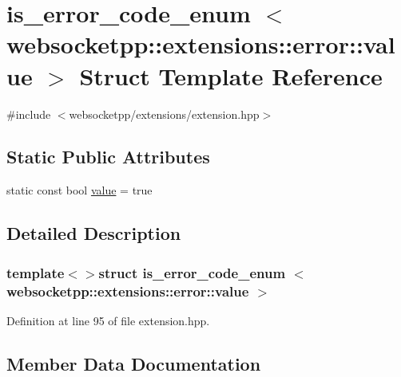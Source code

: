 \hypertarget{structis__error__code__enum_01_01_01_01_3_01websocketpp_1_1extensions_1_1error_1_1value_01_4}{}\section{is\+\_\+error\+\_\+code\+\_\+enum $<$ websocketpp\+:\+:extensions\+:\+:error\+:\+:value $>$ Struct Template Reference}
\label{structis__error__code__enum_01_01_01_01_3_01websocketpp_1_1extensions_1_1error_1_1value_01_4}


{\ttfamily \#include $<$websocketpp/extensions/extension.\+hpp$>$}

\subsection*{Static Public Attributes}
\begin{DoxyCompactItemize}
\item 
static const bool \hyperlink{structis__error__code__enum_01_01_01_01_3_01websocketpp_1_1extensions_1_1error_1_1value_01_4_a035870062b1c893460f245bb070efc5e}{value} = true
\end{DoxyCompactItemize}


\subsection{Detailed Description}
\subsubsection*{template$<$$>$struct is\+\_\+error\+\_\+code\+\_\+enum    $<$ websocketpp\+::extensions\+::error\+::value $>$}



Definition at line 95 of file extension.\+hpp.



\subsection{Member Data Documentation}
\hypertarget{structis__error__code__enum_01_01_01_01_3_01websocketpp_1_1extensions_1_1error_1_1value_01_4_a035870062b1c893460f245bb070efc5e}{}
